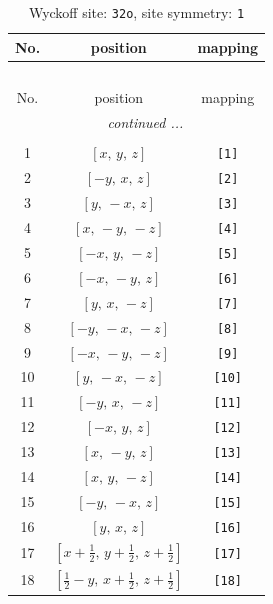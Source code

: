 \documentclass[fleqn,8pt]{jsarticle}
\begin{document}
\renewcommand{\arraystretch}{1.2}
\begin{longtable}{ccc}
\caption{Wyckoff site: {\tt 32o}, site symmetry: {\tt 1}}
 \\
 \hline \hline
No. & position & mapping \\ \hline \endfirsthead

\multicolumn{2}{l}{\tablename\ \thetable{}} \\
 \hline \hline
No. & position & mapping \\ \hline \endhead

 \hline \hline
\multicolumn{2}{r}{\footnotesize\it continued ...} \\ \endfoot

 \hline \hline
\multicolumn{2}{r}{} \\ \endlastfoot

1 & $\left[ x,\, y,\, z \right]$ & {\tt [1]} \\ \hline
2 & $\left[ - y,\, x,\, z \right]$ & {\tt [2]} \\ \hline
3 & $\left[ y,\, - x,\, z \right]$ & {\tt [3]} \\ \hline
4 & $\left[ x,\, - y,\, - z \right]$ & {\tt [4]} \\ \hline
5 & $\left[ - x,\, y,\, - z \right]$ & {\tt [5]} \\ \hline
6 & $\left[ - x,\, - y,\, z \right]$ & {\tt [6]} \\ \hline
7 & $\left[ y,\, x,\, - z \right]$ & {\tt [7]} \\ \hline
8 & $\left[ - y,\, - x,\, - z \right]$ & {\tt [8]} \\ \hline
9 & $\left[ - x,\, - y,\, - z \right]$ & {\tt [9]} \\ \hline
10 & $\left[ y,\, - x,\, - z \right]$ & {\tt [10]} \\ \hline
11 & $\left[ - y,\, x,\, - z \right]$ & {\tt [11]} \\ \hline
12 & $\left[ - x,\, y,\, z \right]$ & {\tt [12]} \\ \hline
13 & $\left[ x,\, - y,\, z \right]$ & {\tt [13]} \\ \hline
14 & $\left[ x,\, y,\, - z \right]$ & {\tt [14]} \\ \hline
15 & $\left[ - y,\, - x,\, z \right]$ & {\tt [15]} \\ \hline
16 & $\left[ y,\, x,\, z \right]$ & {\tt [16]} \\ \hline
17 & $\left[ x + \frac{1}{2},\, y + \frac{1}{2},\, z + \frac{1}{2} \right]$ & {\tt [17]} \\ \hline
18 & $\left[ \frac{1}{2} - y,\, x + \frac{1}{2},\, z + \frac{1}{2} \right]$ & {\tt [18]} \\ \hline

\end{longtable}
\end{document}
